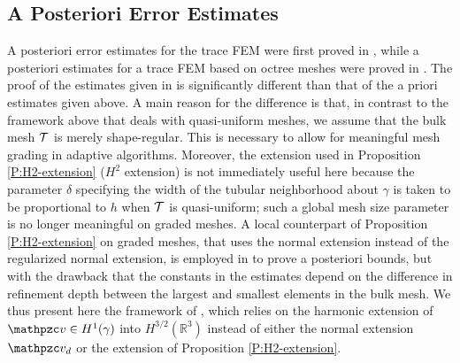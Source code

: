 \subsection{A Posteriori Error Estimates}

A posteriori error estimates for the trace FEM were first proved in \cite{DO12}, while a posteriori estimates for a trace FEM based on octree meshes were proved in \cite{CO15}.    The proof of the estimates given in \cite{DO12} is significantly different than that of the a priori estimates given above.  A main reason for the difference is that, in contrast to the framework above that deals with quasi-uniform meshes, we assume that the bulk mesh $\mathcal{T}$ is merely shape-regular.  This is necessary to allow for meaningful mesh grading in adaptive algorithms. Moreover, the extension used in Proposition \ref{P:H2-extension} ($H^2$ extension) is not immediately useful here because the parameter $\delta$ specifying the width of the tubular neighborhood about $\gamma$ is taken to be proportional to $h$ when $\mathcal{T}$ is quasi-uniform; such a global mesh size parameter is no longer meaningful on graded meshes.  A local counterpart of Proposition \ref{P:H2-extension} on graded meshes, that uses the normal extension instead of the regularized normal extension, is employed in \cite{CO15} to prove a posteriori bounds, but with the drawback that the constants in the estimates depend on the difference in refinement depth between the largest and smallest elements in the bulk mesh.  We thus present here the framework of \cite{DO12}, which relies on the harmonic extension of $\tv \in H^1(\gamma)$ into $H^{3/2}(\mathbb{R}^3)$ instead of either the normal extension $\tv_d$ or the extension of Proposition \ref{P:H2-extension}.  


\iffalse
\medskip\noindent

